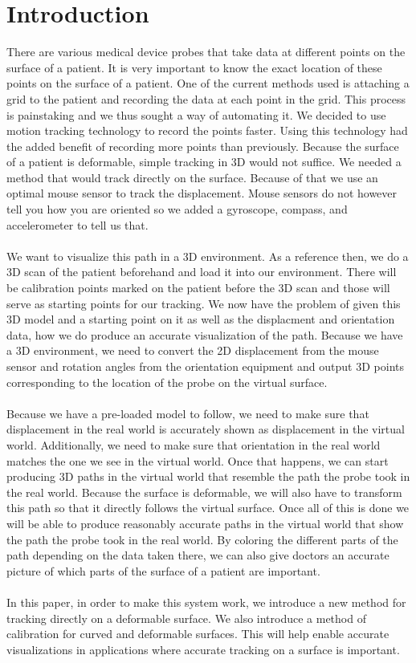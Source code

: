 \section{Introduction}

There are various medical device probes that take data at different points on the surface of a patient. It is very important to know the exact location of these points on the surface of a patient. One of the current methods used is attaching a grid to the patient and recording the data at each point in the grid. This process is painstaking and we thus sought a way of automating it. We decided to use motion tracking technology to record the points faster. Using this technology had the added benefit of recording more points than previously. Because the surface of a patient is deformable, simple tracking in 3D would not suffice. We needed a method that would track directly on the surface. Because of that we use an optimal mouse sensor to track the displacement. Mouse sensors do not however tell you how you are oriented so we added a gyroscope, compass, and accelerometer to tell us that. \\
\\
We want to visualize this path in a 3D environment. As a reference then, we do a 3D scan of the patient beforehand and load it into our environment. There will be calibration points marked on the patient before the 3D scan and those will serve as starting points for our tracking. We now have the problem of given this 3D model and a starting point on it as well as the displacment and orientation data, how we do produce an accurate visualization of the path. Because we have a 3D environment, we need to convert the 2D displacement from the mouse sensor and rotation angles from the orientation equipment and output 3D points corresponding to the location of the probe on the virtual surface. \\
\\
Because we have a pre-loaded model to follow, we need to make sure that displacement in the real world is accurately shown as displacement in the virtual world. Additionally, we need to make sure that orientation in the real world matches the one we see in the virtual world. Once that happens, we can start producing 3D paths in the virtual world that resemble the path the probe took in the real world. Because the surface is deformable, we will also have to transform this path so that it directly follows the virtual surface. Once all of this is done we will be able to produce reasonably accurate paths in the virtual world that show the path the probe took in the real world. By coloring the different parts of the path depending on the data taken there, we can also give doctors an accurate picture of which parts of the surface of a patient are important.\\
\\
In this paper, in order to make this system work, we introduce a new method for tracking directly on a deformable surface. We also introduce a method of calibration for curved and deformable surfaces. This will help enable accurate visualizations in applications where accurate tracking on a surface is important.